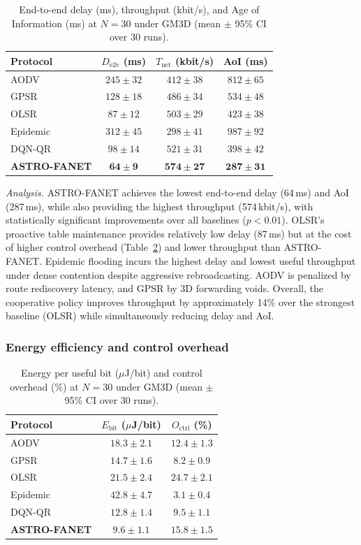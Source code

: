 \documentclass[5p,times]{elsarticle}
\begin{document}
\begin{table}[t]
\centering
\caption{End-to-end delay (ms), throughput (kbit/s), and Age of Information (ms) at $N=30$ under GM3D (mean $\pm$ 95\% CI over 30 runs).}
\label{tab:delay_aoi}
\scriptsize
\begin{tabular}{lccc}
\toprule
Protocol & $D_{\mathrm{e2e}}$ (ms) & $T_{\mathrm{net}}$ (kbit/s) & AoI (ms) \\
\midrule
AODV & $245 \pm 32$ & $412 \pm 38$ & $812 \pm 65$ \\
GPSR & $128 \pm 18$ & $486 \pm 34$ & $534 \pm 48$ \\
OLSR & $87 \pm 12$ & $503 \pm 29$ & $423 \pm 38$ \\
Epidemic & $312 \pm 45$ & $298 \pm 41$ & $987 \pm 92$ \\
DQN-QR & $98 \pm 14$ & $521 \pm 31$ & $398 \pm 42$ \\
\textbf{ASTRO-FANET} & $\mathbf{64 \pm 9}$ & $\mathbf{574 \pm 27}$ & $\mathbf{287 \pm 31}$ \\
\bottomrule
\end{tabular}
\end{table}

\textit{Analysis.} ASTRO-FANET achieves the lowest end-to-end delay (64\,ms) and AoI (287\,ms), while also providing the highest throughput (574\,kbit/s), with statistically significant improvements over all baselines ($p < 0.01$). OLSR's proactive table maintenance provides relatively low delay (87\,ms) but at the cost of higher control overhead (Table~\ref{tab:energy}) and lower throughput than ASTRO-FANET. Epidemic flooding incurs the highest delay and lowest useful throughput under dense contention despite aggressive rebroadcasting. AODV is penalized by route rediscovery latency, and GPSR by 3D forwarding voids. Overall, the cooperative policy improves throughput by approximately 14\% over the strongest baseline (OLSR) while simultaneously reducing delay and AoI.

\subsubsection{Energy efficiency and control overhead}

\begin{table}[t]
\centering
\caption{Energy per useful bit ($\mu$J/bit) and control overhead (\%) at $N=30$ under GM3D (mean $\pm$ 95\% CI over 30 runs).}
\label{tab:energy}
\scriptsize
\begin{tabular}{lcc}
\toprule
Protocol & $E_{\mathrm{bit}}$ ($\mu$J/bit) & $O_{\mathrm{ctrl}}$ (\%) \\
\midrule
AODV & $18.3 \pm 2.1$ & $12.4 \pm 1.3$ \\
GPSR & $14.7 \pm 1.6$ & $8.2 \pm 0.9$ \\
OLSR & $21.5 \pm 2.4$ & $24.7 \pm 2.1$ \\
Epidemic & $42.8 \pm 4.7$ & $3.1 \pm 0.4$ \\
DQN-QR & $12.8 \pm 1.4$ & $9.5 \pm 1.1$ \\
\textbf{ASTRO-FANET} & $\mathbf{9.6 \pm 1.1}$ & $15.8 \pm 1.5$ \\
\bottomrule
\end{tabular}
\end{table}
\end{document}
